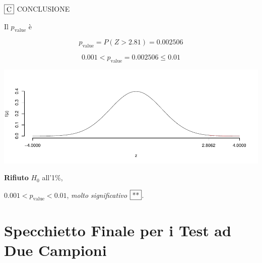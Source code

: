 \documentclass[
  11pt,
]{book}
\theoremstyle{mytheoremstyle}
\theoremstyle{mydefstyle}
\begin{document}
\(\fbox{C}\) CONCLUSIONE

Il \(p_{\text{value}}\) è

\[ p_{\text{value}} = P(Z>2.81)=0.002506 \]

\[
 0.001 < p_\text{value}= 0.002506 \leq 0.01 
\]

\begin{center}\includegraphics{Appunti_di_Statistica_2025_files/figure-latex/16-test-2C-3-1} \end{center}

\textbf{Rifiuto} \(H_0\) all'1\%,

\(0.001<p_\text{value}<0.01\), \emph{molto significativo} \(\fbox{**}\).

\section{Specchietto Finale per i Test ad Due Campioni}\label{specchietto-finale-per-i-test-ad-due-campioni}
\end{document}

